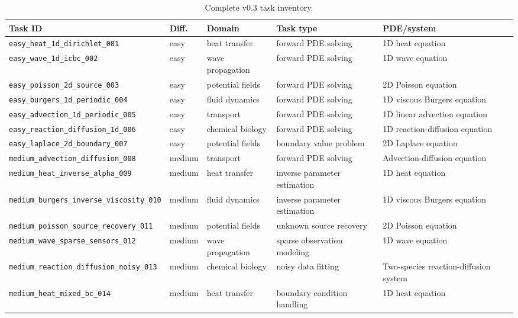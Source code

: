 \documentclass[11pt]{article}
\begin{document}
\begin{table}[t]
\caption{Complete v0.3 task inventory.}
\label{tab:full-task-inventory}
\centering
\scriptsize
\begin{tabularx}{\textwidth}{@{}p{}p{}p{}p{}X@{}}
\toprule
\textbf{Task ID} & \textbf{Diff.} & \textbf{Domain} & \textbf{Task type} & \textbf{PDE/system} \\
\midrule
\texttt{easy\_heat\_1d\_dirichlet\_001} & easy & heat transfer & forward PDE solving & 1D heat equation \\
\texttt{easy\_wave\_1d\_icbc\_002} & easy & wave propagation & forward PDE solving & 1D wave equation \\
\texttt{easy\_poisson\_2d\_source\_003} & easy & potential fields & forward PDE solving & 2D Poisson equation \\
\texttt{easy\_burgers\_1d\_periodic\_004} & easy & fluid dynamics & forward PDE solving & 1D viscous Burgers equation \\
\texttt{easy\_advection\_1d\_periodic\_005} & easy & transport & forward PDE solving & 1D linear advection equation \\
\texttt{easy\_reaction\_diffusion\_1d\_006} & easy & chemical biology & forward PDE solving & 1D reaction-diffusion equation \\
\texttt{easy\_laplace\_2d\_boundary\_007} & easy & potential fields & boundary value problem & 2D Laplace equation \\
\texttt{medium\_advection\_diffusion\_008} & medium & transport & forward PDE solving & Advection-diffusion equation \\
\texttt{medium\_heat\_inverse\_alpha\_009} & medium & heat transfer & inverse parameter estimation & 1D heat equation \\
\texttt{medium\_burgers\_inverse\_viscosity\_010} & medium & fluid dynamics & inverse parameter estimation & 1D viscous Burgers equation \\
\texttt{medium\_poisson\_source\_recovery\_011} & medium & potential fields & unknown source recovery & 2D Poisson equation \\
\texttt{medium\_wave\_sparse\_sensors\_012} & medium & wave propagation & sparse observation modeling & 1D wave equation \\
\texttt{medium\_reaction\_diffusion\_noisy\_013} & medium & chemical biology & noisy data fitting & Two-species reaction-diffusion system \\
\texttt{medium\_heat\_mixed\_bc\_014} & medium & heat transfer & boundary condition handling & 1D heat equation \\

\end{tabularx}
\end{table}
\end{document}
